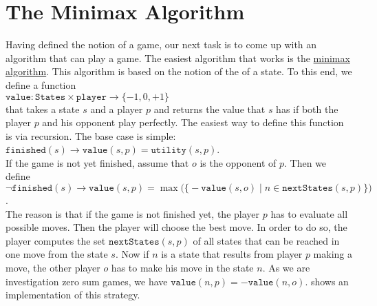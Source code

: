 \section{The Minimax Algorithm}
Having defined the notion of a game, our next task is to come up with an algorithm that can play a game.  The
easiest algorithm that works is the \href{https://en.wikipedia.org/wiki/Minimax}{minimax algorithm}.  This
algorithm is based on the notion of the  of a state.  To this end, we define a function
\\[0.2cm]
\hspace*{1.3cm}
$\mathtt{value}: \mathtt{States} \times \mathtt{player} \rightarrow \{-1, 0, +1\}$
\\[0.2cm]
that takes a state $s$ and a player $p$ and returns the value that $s$ has if both the player $p$ and his
opponent play perfectly.  The easiest way to define this function is via recursion.  The base case is simple:
\\[0.2cm]
\hspace*{1.3cm}
$\mathtt{finished}(s) \rightarrow \mathtt{value}(s, p) = \mathtt{utility}(s, p)$.
\\[0.2cm]
If the game is not yet finished, assume that $o$ is the opponent of $p$.  Then we define
\\[0.2cm]
\hspace*{1.3cm}
$\neg \mathtt{finished}(s) \rightarrow 
 \mathtt{value}(s, p) = \max\bigl(\bigl\{
                     -\mathtt{value}(s, o) \mid n \in \mathtt{nextStates}(s, p)
                     \bigr\}\bigr)
$.
\\[0.2cm]
The reason is that if the game is not finished yet, the player $p$ has to evaluate all possible moves.  
Then the player will choose the best move.  In order to do so, the player computes the set
$\mathtt{nextStates}(s, p)$ of all states that can be reached in one move from the state $s$.
Now if $n$ is a state that results from player $p$ making a move, the other player $o$ has to make his move in
the state $n$.  As we are investigation zero sum games, we have $\mathtt{value}(n, p) = -\mathtt{value}(n, o)$.
 shows an implementation of this strategy.


